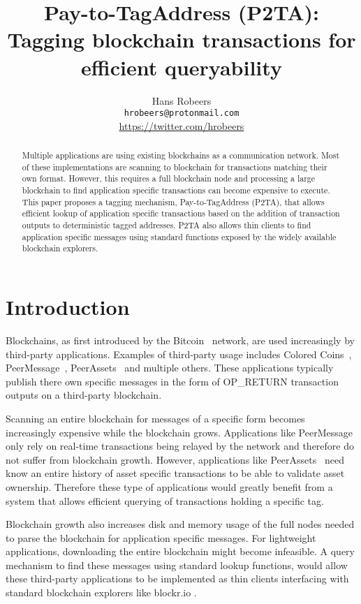 \documentclass[a4paper,10pt]{article}
\title{Pay-to-TagAddress (P2TA): Tagging blockchain transactions for efficient queryability}
\author{Hans Robeers\\ \texttt{hrobeers@protonmail.com}\\ \url{https://twitter.com/hrobeers}}
\begin{document}
\maketitle

\begin{abstract}
Multiple applications are using existing blockchains as a communication network.
Most of these implementations are scanning to blockchain for transactions matching their own format.
However, this requires a full blockchain node and processing a large blockchain to find application specific transactions can become expensive to execute.
This paper proposes a tagging mechanism, Pay-to-TagAddress (P2TA), that allows efficient lookup of application specific transactions based on the addition of transaction outputs to deterministic tagged addresses. P2TA also allows thin clients to find application specific messages using standard functions exposed by the widely available blockchain explorers.
\end{abstract}

\doclicenseThis

\section{Introduction}
Blockchains, as first introduced by the Bitcoin~\cite{Nak08} network, are used increasingly by third-party applications.
Examples of third-party usage includes Colored Coins~\cite{Ros12}, PeerMessage~\cite{Emeth}, PeerAssets~\cite{Pchem} and multiple others.
These applications typically publish there own specific messages in the form of OP\_RETURN transaction outputs on a third-party blockchain.

Scanning an entire blockchain for messages of a specific form becomes increasingly expensive while the blockchain grows.
Applications like PeerMessage~\cite{Emeth} only rely on real-time transactions being relayed by the network and therefore do not suffer from blockchain growth.
However, applications like PeerAssets~\cite{Pchem} need know an entire history of asset specific transactions to be able to validate asset ownership.
Therefore these type of applications would greatly benefit from a system that allows efficient querying of transactions holding a specific tag.

Blockchain growth also increases disk and memory usage of the full nodes needed to parse the blockchain for application specific messages. For lightweight applications, downloading the entire blockchain might become infeasible. A query mechanism to find these messages using standard lookup functions, would allow these third-party applications to be implemented as thin clients interfacing with standard blockchain explorers like blockr.io \cite{Blockr}.
\end{document}

